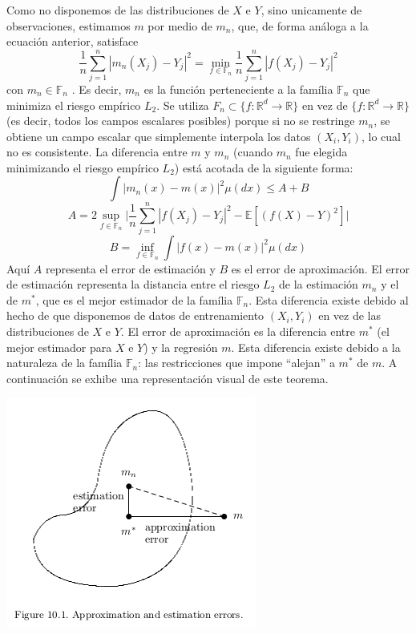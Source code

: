 \documentclass[12pt, a4paper]{article}
\begin{document}
Como no disponemos de las distribuciones de $X$ e $Y$, sino unicamente de observaciones, estimamos $m$ por medio de $m_n$, que, de forma análoga a la ecuación anterior, satisface
$$
\frac{1}{n} \sum_{j=1}^n | m_n(X_j) -Y_j |^2 
= 
\mathop{min}_{f\in\mathds{F}_n}
\frac{1}{n} \sum_{j=1}^n | f(X_j) -Y_j |^2
$$
con $m_n\in\mathds{F}_n$ . Es decir, $m_n$ es la función perteneciente a la família $\mathds{F}_n$ que minimiza el riesgo empírico $L_2$.
Se utiliza $F_n\subset \{ f:\mathds{R}^d \rightarrow \mathds{R}\}$ en vez de $\{ f:\mathds{R}^d \rightarrow \mathds{R}\}$ (es decir, todos los campos escalares posibles) porque si no se restringe $m_n$, se obtiene un campo escalar que simplemente interpola los datos $(X_i,Y_i)$, lo cual no es consistente.
La diferencia entre $m$ y $m_n$ (cuando $m_n$ fue elegida minimizando el riesgo empírico $L_2$) está acotada de la siguiente forma:
$$
\int |m_n(x)-m(x)|^2 \mu(dx) \leq A + B
$$
$$
A=2\mathop{sup}_{f\in\mathds{F}_n} \Bigg| \frac{1}{n}\sum_{j=1}^n |f(X_j)-Y_j|^2 - \mathds{E}[(f(X)-Y)^2] \Bigg|
$$
$$
B=\mathop{inf}_{f\in\mathds{F}_n} \int |f(x)-m(x)|^2 \mu(dx)
$$
Aquí $A$ representa el error de estimación y $B$ es el error de aproximación. El error de estimación representa la distancia entre el riesgo $L_2$ de la estimación $m_n$ y el de $m^{*}$, que es el mejor estimador de la família $\mathds{F}_n$. Esta diferencia existe debido al hecho de que disponemos de datos de entrenamiento $(X_i,Y_i)$ en vez de las distribuciones de $X$ e $Y$. El error de aproximación es la diferencia entre $m^{*}$ (el mejor estimador para $X$ e $Y$) y la regresión $m$. Esta diferencia existe debido a la naturaleza de la família $\mathds{F}_n$: las restricciones que impone ``alejan'' a $m^{*}$ de $m$. A continuación se exhibe una representación visual de este teorema.


\includegraphics[scale=0.65]{teorema-visual.png}
\end{document}
